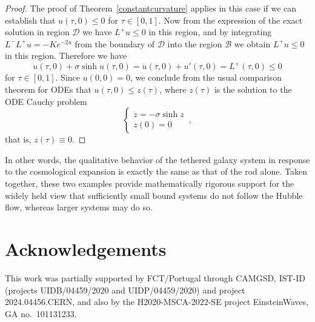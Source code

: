 \documentclass[10pt]{amsart}
\begin{document}
\begin{proof}
The proof of Theorem~\ref{constantcurvature} applies in this case if we can establish that $u(\tau,0)\leq 0$ for $\tau \in [0,1]$. Now from the expression of the exact solution in region $\mathcal{D}$ we have $L^+u \leq 0$ in this region, and by integrating $L^-L^+ u = - K e^{-2u}$ from the boundary of $\mathcal{D}$ into the region $\mathcal{B}$ we obtain $L^+ u \leq 0$ in this region. Therefore we have
\begin{equation}
\dot{u}(\tau,0) + \sigma \sinh u(\tau,0) = \dot{u}(\tau,0) + u'(\tau,0) = L^+(\tau,0) \leq 0
\end{equation}
for $\tau \in [0,1]$. Since $u(0,0)=0$, we conclude from the usual comparison theorem for ODEs that $u(\tau,0)\leq z(\tau)$, where $z(\tau)$ is the solution to the ODE Cauchy problem
\begin{equation}
\begin{cases}
\dot{z} = - \sigma\sinh z \\
z(0)=0
\end{cases} \, ,
\end{equation}
that is, $z(\tau) \equiv 0$.
\end{proof}

In other words, the qualitative behavior of the tethered galaxy system in response to the cosmological expansion is exactly the same as that of the rod alone. Taken together, these two examples provide mathematically rigorous support for the widely held view that sufficiently small bound systems do not follow the Hubble flow, whereas larger systems may do so.
%
%
\section*{Acknowledgements}
This work was partially supported by FCT/Portugal through CAMGSD, IST-ID (projects UIDB/04459/2020 and UIDP/04459/2020) and project 2024.04456.CERN, and also by the H2020-MSCA-2022-SE project EinsteinWaves, GA no.~101131233. 
%
%
\appendix
%
\end{document}

